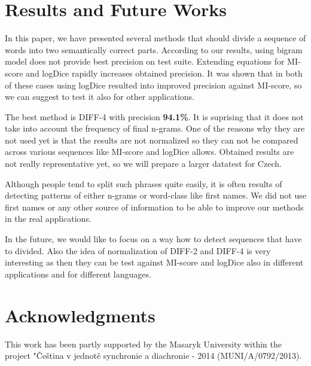 \documentclass[runningheads]{llncs}
\begin{document}

\section{Results and Future Works}

In this paper, we have presented several methods that should divide a
sequence of words into two semantically correct parts. According to our
results, using bigram model does not provide best precision on test suite.
Extending equations for MI-score and logDice rapidly increases obtained
precision. It was shown that in both of these cases using logDice resulted
into improved precision against MI-score, so we can suggest to test it also
for other applications. 

The best method is DIFF-4 with precision {\bf 94.1\%}. It is suprising that
it does not take into account the frequency of final n-grams. One of the
reasons why they are not used yet is that the results are not normalized so
they can not be compared across various sequences like MI-score and logDice
allows. Obtained results are not really representative yet, so we will
prepare a larger datatest for Czech.

Although people tend to split such phrases quite easily, it is often results
of detecting patterns of either n-grams or word-class like first names. We
did not use first names or any other source of information to be able to
improve our methods in the real applications. 

In the future, we would like to focus on a way how to detect sequences that
have to divided. Also the idea of normalization of DIFF-2 and DIFF-4 is very
interesting as then they can be test against MI-score and logDice also in
different applications and for different languages.

\section*{Acknowledgments}

This work has been partly supported by the Masaryk University within the
project "\v{C}e\v{s}tina v jednot\v{e} synchronie a diachronie - 2014
(MUNI/A/0792/2013).



\end{document}
